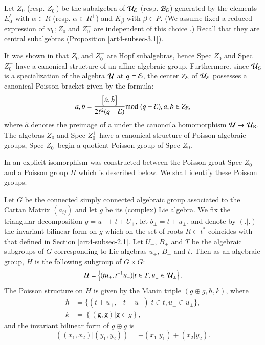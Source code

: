 Let $Z_{0}$ (resp. $Z_{0}^{+}$) be the subalgebra of $\mathcal{U}_{\mathcal{E}}$ (resp. $\mathcal{B}_{\mathcal{E}}$) generated by the elements $E_{\alpha}^{\ell}$ with $\alpha \in R$ (resp. $\alpha \in R^{+}$) and $K_{\beta}$ with $\beta \in P$. (We assume fixed a reduced expression of $w_{0}; Z_{0}$ and $Z_{0}^{+}$ are independent of this choice \cite{art4-keyDK1}.) Recall that they are central subalgebras (Proposition \ref{art4-subsec-3.1}).

It was shown in \cite{art4-keyDK1} that $Z_{0}$ and $Z_{0}^{+}$ are Hopf subalgebras, hence Spec $Z_{0}$ and Spec $Z_{0}^{+}$ have a canonical structure of an affine algebraic group. Furthermore. since $\mathcal{U}_{\mathcal{E}}$ is a specialization of the algebra $\mathcal{U}$ at $q = \mathcal{E}$, the center $Z_{\mathcal{E}}$ of $\mathcal{U}_{\mathcal{E}}$ possesses a canonical Poisson bracket given by the formula:
$$
{a, b} =\dfrac{\left[\hat{a}, \hat{b}\right]}{2\ell^{2}(q-\mathcal{E})}{\rm{mod}}\kern.3em (q-\mathcal{E}), a, b \in Z_{\mathcal{E}},
$$
where $\hat{a}$ denotes the preimage of a under the canoncila homomorphism $\mathcal{U} \rightarrow \mathcal{U}_{\mathcal{E}}$. The algebras $Z_{0}$ and Spec $Z_{0}^{+}$ have a canonical structure of Poisson algebraic groups, Spec $Z_{0}^{+}$ begin a quotient Poisson group of Spec $Z_{0}$.

In \cite{art4-keyDKP1} an explicit isomorphism was constructed between the Poisson grout Spec $Z_{0}$ and a Poisson group $H$ which is described below. We shall identify these Poisson groups.

Let $G$ be the connected simply connected algebraic group associated to the Cartan Matrix $(a_{ij})$ and let $g$ be its (complex) Lie algebra. We fix the triangular decomposition $g=u_{-} + t + U_{+}$, let $b_{\pm} = t + u_{\pm}$, and denote by $(. | .)$ the invariant bilinear form on $g$ which on the set of roots $R\subset t^{*}$ coincides with that defined in Section \ref{art4-subsec-2.1}. Let $U_{\pm}$, $B_{\pm}$ and $T$ be the algebraic subgroups of $G$ corresponding to Lie algebras $u_{\pm}$, $B_{\pm}$ and $t$. Then as an algebraic group, $H$ is the following subgroup of $G\times G$:
$$
H = \left\{(tu_{+}, t^{-1}u_{-}) | t \in T, u_{\pm} \in \mathcal{U}_{\pm}\right\}.
$$ 
The Poisson structure on $H$ is given by the Manin triple $(g \oplus g, \hbar, k)$, where 
\begin{align*}
\hbar &= \{(t +u_{+}, -t+ u_{-}) | t\in t, u_{\pm} \in u_{\pm}\},\\ 
k &= \left\{(\mathsf{g},\mathsf{g}) |  \mathsf{g} \in g\right\},
\end{align*}
and the invariant bilinear form of $g\oplus g$ is 
$$
((x_{1}, x_{2})| (y_{1}, y_{2})) = -(x_{1}| y_{1}) + (x_{2} | y_{2}).
$$

